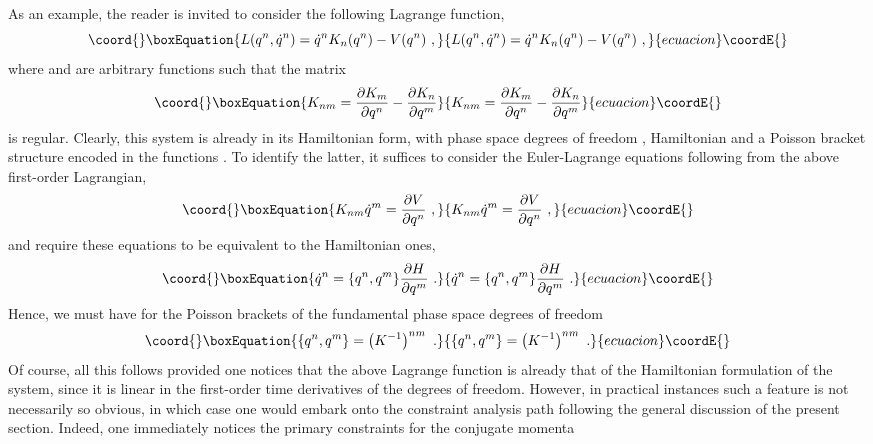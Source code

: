 \documentclass[a4paper,11pt]{article}
\begin{document}
As an example, the reader is invited to consider the following Lagrange
function,
\begin{equation}\coord{}\boxEquation{
L(q^n,\dot{q}^n)=\dot{q}^nK_n(q^n)-V(q^n)\ ,
}{
L(q^n,\dot{q}^n)=\dot{q}^nK_n(q^n)-V(q^n)\ ,
}{ecuacion}\coordE{}\end{equation}
where \coordHE{} and \coordHE{} are arbitrary functions such that the
matrix
\begin{equation}\coord{}\boxEquation{K_{nm}=
\frac{\partial K_m}{\partial q^n}-\frac{\partial K_n}{\partial q^m}
}{K_{nm}=
\frac{\partial K_m}{\partial q^n}-\frac{\partial K_n}{\partial q^m}
}{ecuacion}\coordE{}\end{equation}
is regular. Clearly, this system is already in its Hamiltonian 
form,\cite{JG1,FJ}
with phase space degrees of freedom \coordHE{}, Hamiltonian \coordHE{} and
a Poisson bracket structure \coordHE{} encoded in the functions 
\coordHE{}. To identify the latter, it suffices to consider the Euler-Lagrange 
equations following from the above first-order Lagrangian,
\begin{equation}\coord{}\boxEquation{
K_{nm}\dot{q}^m=\frac{\partial V}{\partial q^n}\ ,
}{
K_{nm}\dot{q}^m=\frac{\partial V}{\partial q^n}\ ,
}{ecuacion}\coordE{}\end{equation}
and require these equations to be equivalent to the Hamiltonian ones,
\begin{equation}\coord{}\boxEquation{
\dot{q}^n=\{q^n,q^m\}\frac{\partial H}{\partial q^m}\ .
}{
\dot{q}^n=\{q^n,q^m\}\frac{\partial H}{\partial q^m}\ .
}{ecuacion}\coordE{}\end{equation}
Hence, we must have for the Poisson brackets of the fundamental phase space
degrees of freedom
\begin{equation}\coord{}\boxEquation{
\{q^n,q^m\}=\left(K^{-1}\right)^{nm}\ .
}{
\{q^n,q^m\}=\left(K^{-1}\right)^{nm}\ .
}{ecuacion}\coordE{}\end{equation}
Of course, all this follows provided one notices that the above Lagrange
function is already that of the Hamiltonian formulation of the system,
since it is linear in the first-order time derivatives of the degrees of
freedom. However, in practical instances such a feature is not necessarily
so obvious, in which case one would embark onto the constraint analysis
path following the ge\-ne\-ral discussion of the present section. Indeed, one
immediately notices the primary constraints for the conjugate momenta
\end{document}
